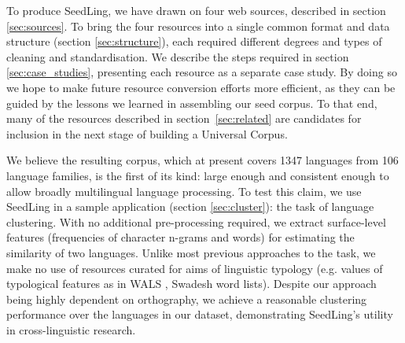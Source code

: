 To produce SeedLing, we have drawn on four web sources, described in section \ref{sec:sources}. To bring the four resources into a single common format and data structure (section \ref{sec:structure}), each required different degrees and types of cleaning and standardisation. We describe the steps required in section \ref{sec:case_studies}, presenting each resource as a separate case study. By doing so we hope to make future resource conversion efforts more efficient, as they can be guided by the lessons we learned in assembling our seed corpus. To that end, many of the resources described in section~\ref{sec:related} are candidates for inclusion in the next stage of building a Universal Corpus.

We believe the resulting corpus, which at present covers 1347 languages from 106 language families, is the first of its kind: large enough and consistent enough to allow broadly multilingual language processing. To test this claim, we use SeedLing in a sample application (section \ref{sec:cluster}): the task of language clustering. With no additional pre-processing required, we extract surface-level features (frequencies of character n-grams and words) for estimating the similarity of two languages. Unlike most previous approaches to the task, we make no use of resources curated for aims of linguistic typology (e.g. values of typological features as in WALS \cite{wals}, Swadesh word lists). Despite our approach being highly dependent on orthography, we achieve a reasonable clustering performance over the languages in our dataset, demonstrating SeedLing's utility in cross-linguistic research. 





